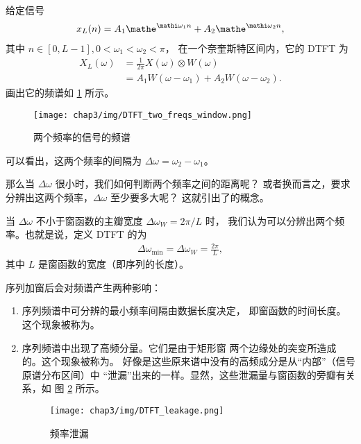 \begin{example}
    给定信号
    \begin{align*}
        x_L(n) = A_1\mathe^{\mathi\omega_1 n} + A_2\mathe^{\mathi\omega_2 n},
    \end{align*}
    其中 $n \in [0, L-1], 0 < \omega_1 < \omega_2 < \pi$，
    在一个奈奎斯特区间内，它的 DTFT 为
    \begin{align*}
        X_L(\omega) & = \frac{1}{2\pi}X(\omega) \otimes W(\omega) \\
        & = A_1W(\omega - \omega_1) + A_2W(\omega - \omega_2).
    \end{align*}
    画出它的频谱如 \ref{fig:DTFT-two-freqs-window.png} 所示。
    \begin{figure}[H]
        \centering
        \texttt{[image: chap3/img/DTFT\_two\_freqs\_window.png]}
        \caption{两个频率的信号的频谱}
        \label{fig:DTFT-two-freqs-window.png}
    \end{figure}
    可以看出，这两个频率的间隔为 $\Delta\omega = \omega_2 - \omega_1$。
\end{example}

\begin{definition}[频谱分辨率]
    那么当 $\Delta\omega$ 很小时，我们如何判断两个频率之间的距离呢？
    或者换而言之，要求分辨出这两个频率，$\Delta\omega$ 至少要多大呢？
    这就引出了的概念。

    当 $\Delta\omega$ 不小于窗函数的主瓣宽度 $\Delta\omega_W = 2\pi/L$ 时，
    我们认为可以分辨出两个频率。也就是说，定义 DTFT 的为
    \begin{align*}
        \Delta\omega_{\min} = \Delta\omega_W = \frac{2\pi}{L},
    \end{align*}
    其中 $L$ 是窗函数的宽度（即序列的长度）。
\end{definition}

\begin{remark}
    序列加窗后会对频谱产生两种影响：
    \begin{enumerate}
        \item 序列频谱中可分辨的最小频率间隔由数据长度决定，
            即窗函数的时间长度。这个现象被称为。
        \item 序列频谱中出现了高频分量。它们是由于矩形窗
            两个边缘处的突变所造成的。这个现象被称为。
            好像是这些原来谱中没有的高频成分是从``内部''（信号原谱分布区间）中
            ``泄漏''出来的一样。显然，这些泄漏量与窗函数的旁瓣有关系，如
            图 \ref{fig:DTFT-leakage.png} 所示。
            \begin{figure}[H]
                \centering
                \texttt{[image: chap3/img/DTFT\_leakage.png]}
                \caption{频率泄漏}
                \label{fig:DTFT-leakage.png}
            \end{figure}
    \end{enumerate}
\end{remark}
